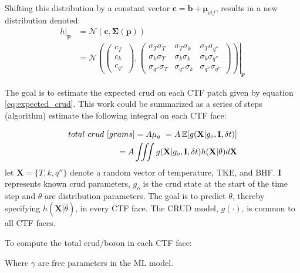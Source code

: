 Shifting this distribution by a constant vector $\bm c=\bm b + \bm \mu_{ctf}$, results in a new distribution denoted:
\begin{align}
    \left. h \right|_{\bm p} & = \mathcal N(\bm c, \bm \Sigma(\mathbf p)) \nonumber \\
    & = \left.
        \mathcal N \left(
        \begin{pmatrix}
            c_T \\
            c_k \\
            c_{q''}
        \end{pmatrix}
    ,
        \begin{pmatrix}
            \sigma_{T} \sigma_{T} & \sigma_{T} \sigma_{k} & \sigma_{T} \sigma_{q''} \\
            \sigma_{k} \sigma_{T} & \sigma_{k} \sigma_{k} & \sigma_{k} \sigma_{q''} \\
            \sigma_{q''} \sigma_{T} & \sigma_{q''} \sigma_{k} & \sigma_{q''} \sigma_{q''}
        \end{pmatrix}
    \right)
    \right|_{\mathbf p}
\end{align}


The goal is to estimate the expected crud on each CTF patch given by equation \ref{eq:expected_crud}.
This work could be summarized as a series of steps (algorithm) estimate the following integral on each CTF face:

\begin{eqnarray}
        total\ crud\ [grams] = A \mu_g\ = A \operatorname*{\mathbb{E}}[g(\mathbf X|g_o, \mathbf I, \delta t)] \nonumber \\
        = A \iiint g(\mathbf X|g_o, \mathbf I, \delta t) h(\mathbf X|\theta) d \mathbf X
        \label{eq:expected_crud}
\end{eqnarray}
let $\mathbf X= \{T, k, q''\}$ denote a random vector of temperature, TKE, and BHF. $\mathbf I$ represents known crud parameters, $g_o$ is the crud state at the start of the time step and $\theta$ are distribution parameters.  The goal is to predict $\theta$, thereby specifying $h(\mathbf X|\hat \theta)$, in every CTF face.  The CRUD model, $g(\cdot)$, is common to all CTF faces.

To compute the total crud/boron in each CTF face:
\\

\begin{algorithm}[H]

\end{algorithm}
Where $\gamma$ are free parameters in the ML model.
\bigskip

